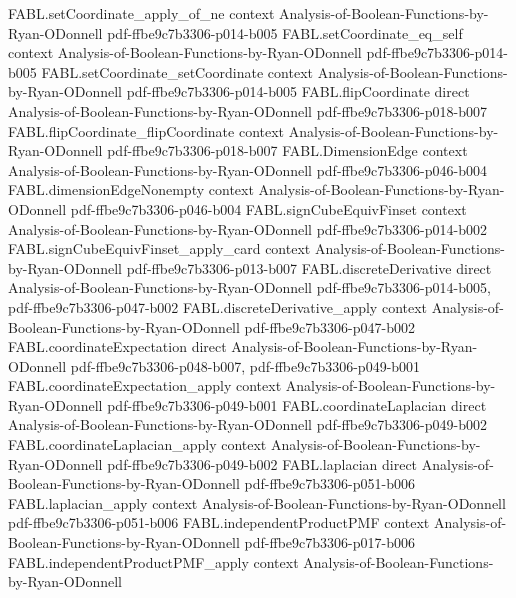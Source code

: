 \begin{theorem}
\proofstep
  {FABL.setCoordinate_apply_of_ne}
  {context}
  {Analysis-of-Boolean-Functions-by-Ryan-ODonnell}
  {pdf-ffbe9c7b3306-p014-b005}
\proofstep
  {FABL.setCoordinate_eq_self}
  {context}
  {Analysis-of-Boolean-Functions-by-Ryan-ODonnell}
  {pdf-ffbe9c7b3306-p014-b005}
\proofstep
  {FABL.setCoordinate_setCoordinate}
  {context}
  {Analysis-of-Boolean-Functions-by-Ryan-ODonnell}
  {pdf-ffbe9c7b3306-p014-b005}
\proofstep
  {FABL.flipCoordinate}
  {direct}
  {Analysis-of-Boolean-Functions-by-Ryan-ODonnell}
  {pdf-ffbe9c7b3306-p018-b007}
\proofstep
  {FABL.flipCoordinate_flipCoordinate}
  {context}
  {Analysis-of-Boolean-Functions-by-Ryan-ODonnell}
  {pdf-ffbe9c7b3306-p018-b007}
\proofstep
  {FABL.DimensionEdge}
  {context}
  {Analysis-of-Boolean-Functions-by-Ryan-ODonnell}
  {pdf-ffbe9c7b3306-p046-b004}
\proofstep
  {FABL.dimensionEdgeNonempty}
  {context}
  {Analysis-of-Boolean-Functions-by-Ryan-ODonnell}
  {pdf-ffbe9c7b3306-p046-b004}
\proofstep
  {FABL.signCubeEquivFinset}
  {context}
  {Analysis-of-Boolean-Functions-by-Ryan-ODonnell}
  {pdf-ffbe9c7b3306-p014-b002}
\proofstep
  {FABL.signCubeEquivFinset_apply_card}
  {context}
  {Analysis-of-Boolean-Functions-by-Ryan-ODonnell}
  {pdf-ffbe9c7b3306-p013-b007}
\proofstep
  {FABL.discreteDerivative}
  {direct}
  {Analysis-of-Boolean-Functions-by-Ryan-ODonnell}
  {pdf-ffbe9c7b3306-p014-b005,
    pdf-ffbe9c7b3306-p047-b002}
\proofstep
  {FABL.discreteDerivative_apply}
  {context}
  {Analysis-of-Boolean-Functions-by-Ryan-ODonnell}
  {pdf-ffbe9c7b3306-p047-b002}
\proofstep
  {FABL.coordinateExpectation}
  {direct}
  {Analysis-of-Boolean-Functions-by-Ryan-ODonnell}
  {pdf-ffbe9c7b3306-p048-b007,
    pdf-ffbe9c7b3306-p049-b001}
\proofstep
  {FABL.coordinateExpectation_apply}
  {context}
  {Analysis-of-Boolean-Functions-by-Ryan-ODonnell}
  {pdf-ffbe9c7b3306-p049-b001}
\proofstep
  {FABL.coordinateLaplacian}
  {direct}
  {Analysis-of-Boolean-Functions-by-Ryan-ODonnell}
  {pdf-ffbe9c7b3306-p049-b002}
\proofstep
  {FABL.coordinateLaplacian_apply}
  {context}
  {Analysis-of-Boolean-Functions-by-Ryan-ODonnell}
  {pdf-ffbe9c7b3306-p049-b002}
\proofstep
  {FABL.laplacian}
  {direct}
  {Analysis-of-Boolean-Functions-by-Ryan-ODonnell}
  {pdf-ffbe9c7b3306-p051-b006}
\proofstep
  {FABL.laplacian_apply}
  {context}
  {Analysis-of-Boolean-Functions-by-Ryan-ODonnell}
  {pdf-ffbe9c7b3306-p051-b006}
\proofstep
  {FABL.independentProductPMF}
  {context}
  {Analysis-of-Boolean-Functions-by-Ryan-ODonnell}
  {pdf-ffbe9c7b3306-p017-b006}
\proofstep
  {FABL.independentProductPMF_apply}
  {context}
  {Analysis-of-Boolean-Functions-by-Ryan-ODonnell}

\end{theorem}
